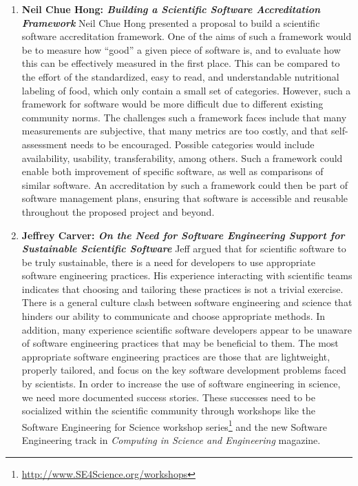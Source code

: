 \documentclass[11pt, oneside]{amsart}
\begin{document}
\begin{enumerate}
\item \textbf{Neil Chue Hong: \textit{Building a Scientific Software
Accreditation Framework}} Neil Chue Hong presented a proposal to build a
scientific software accreditation framework. One of the aims of such a framework
would be to measure how ``good'' a given piece of software is, and to evaluate
how this can be effectively measured in the first place. This can be compared to
the effort of the standardized, easy to read, and understandable nutritional
labeling of food, which only contain a small set of categories. However, such a
framework for software would be more difficult due to different existing
community norms. The challenges such a framework faces include that many
measurements are subjective, that many metrics are too costly, and that
self-assessment needs to be encouraged. Possible categories would include
availability, usability, transferability, among others. Such a framework could
enable both improvement of specific software, as well as comparisons of similar
software. An accreditation by such a framework could then be part of software
management plans, ensuring that software is accessible and reusable throughout
the proposed project and beyond.

\item \textbf{Jeffrey Carver: \textit{On the Need for Software Engineering
Support for Sustainable Scientific Software}} Jeff argued that for scientific
software to be truly sustainable, there is a need for developers to use
appropriate software engineering practices. His experience interacting with
scientific teams indicates that choosing and tailoring these practices is not a
trivial exercise. There is a general culture clash between software engineering
and science that hinders our ability to communicate and choose appropriate
methods. In addition, many experience scientific software developers appear to
be unaware of software engineering practices that may be beneficial to them. The
most appropriate software engineering practices are those that are lightweight,
properly tailored, and focus on the key software development problems faced by
scientists. In order to increase the use of software engineering in science, we
need more documented success stories. These successes need to be socialized
within the scientific community through workshops like the Software Engineering
for Science workshop
series\footnote{\href{http://www.SE4Science.org/workshops}{http://www.SE4Science.org/workshops}}
and the new Software Engineering track in \textit{Computing in Science and
Engineering} magazine.


\end{enumerate}
\end{document}
